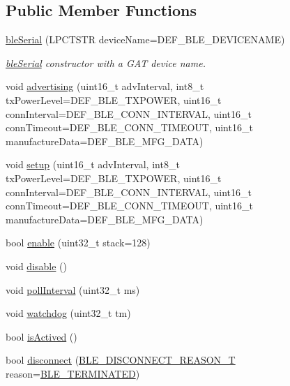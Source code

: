 \subsection*{Public Member Functions}
\begin{DoxyCompactItemize}
\item 
\hyperlink{classble_serial_a835c884c9209b074cf82e5a3f0a322ec}{ble\-Serial} (L\-P\-C\-T\-S\-T\-R device\-Name=D\-E\-F\-\_\-\-B\-L\-E\-\_\-\-D\-E\-V\-I\-C\-E\-N\-A\-M\-E)
\begin{DoxyCompactList}\small\item\em \hyperlink{classble_serial}{ble\-Serial} constructor with a G\-A\-T device name. \end{DoxyCompactList}\item 
void \hyperlink{classble_serial_a0ee4ea2d6d4a38bbd64968336f85c2e9}{advertising} (uint16\-\_\-t adv\-Interval, int8\-\_\-t tx\-Power\-Level=D\-E\-F\-\_\-\-B\-L\-E\-\_\-\-T\-X\-P\-O\-W\-E\-R, uint16\-\_\-t conn\-Interval=D\-E\-F\-\_\-\-B\-L\-E\-\_\-\-C\-O\-N\-N\-\_\-\-I\-N\-T\-E\-R\-V\-A\-L, uint16\-\_\-t conn\-Timeout=D\-E\-F\-\_\-\-B\-L\-E\-\_\-\-C\-O\-N\-N\-\_\-\-T\-I\-M\-E\-O\-U\-T, uint16\-\_\-t manufacture\-Data=D\-E\-F\-\_\-\-B\-L\-E\-\_\-\-M\-F\-G\-\_\-\-D\-A\-T\-A)
\item 
void \hyperlink{classble_serial_acc1e214474c9e98705fb7f363a3eee74}{setup} (uint16\-\_\-t adv\-Interval, int8\-\_\-t tx\-Power\-Level=D\-E\-F\-\_\-\-B\-L\-E\-\_\-\-T\-X\-P\-O\-W\-E\-R, uint16\-\_\-t conn\-Interval=D\-E\-F\-\_\-\-B\-L\-E\-\_\-\-C\-O\-N\-N\-\_\-\-I\-N\-T\-E\-R\-V\-A\-L, uint16\-\_\-t conn\-Timeout=D\-E\-F\-\_\-\-B\-L\-E\-\_\-\-C\-O\-N\-N\-\_\-\-T\-I\-M\-E\-O\-U\-T, uint16\-\_\-t manufacture\-Data=D\-E\-F\-\_\-\-B\-L\-E\-\_\-\-M\-F\-G\-\_\-\-D\-A\-T\-A)
\item 
bool \hyperlink{classble_serial_a3ff1e4b271a7d225e73abd337043d8e4}{enable} (uint32\-\_\-t stack=128)
\item 
void \hyperlink{classble_serial_a08b3a82e95aa527433c04b4a6a3d81d4}{disable} ()
\item 
void \hyperlink{classble_serial_a4188fc1bab7e077cf1d573024f092c7b}{poll\-Interval} (uint32\-\_\-t ms)
\item 
void \hyperlink{classble_serial_a2588b21bf80d35a866dc7e47f97142df}{watchdog} (uint32\-\_\-t tm)
\item 
bool \hyperlink{classble_serial_ab766015c18f219e359edc1c560d66893}{is\-Actived} ()
\item 
bool \hyperlink{classble_serial_a5e63823fd7ff0ef0ac5447cd265b5a5c}{disconnect} (\hyperlink{classble_serial_a5a50139216d995997ee79d3bd058bfe6}{B\-L\-E\-\_\-\-D\-I\-S\-C\-O\-N\-N\-E\-C\-T\-\_\-\-R\-E\-A\-S\-O\-N\-\_\-\-T} reason=\hyperlink{classble_serial_a5a50139216d995997ee79d3bd058bfe6aed29c5e9584bc5b1a88b9fb00e9962f3}{B\-L\-E\-\_\-\-T\-E\-R\-M\-I\-N\-A\-T\-E\-D})

\end{DoxyCompactItemize}
